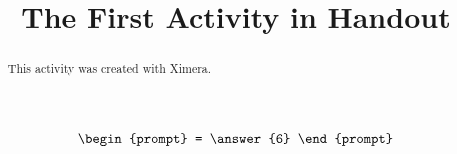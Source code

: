 \documentclass[handout]{ximera}
\title{The First Activity in Handout}
\begin{document}
  
\begin{abstract}  
This activity was created with Ximera.
\end{abstract}  
\maketitle

\begin{problem}  
  \[
  \begin{prompt}
    = \answer{6}
  \end{prompt}
    \]
\end{problem}
\end{document}
